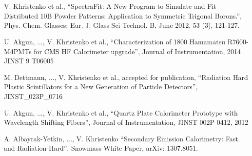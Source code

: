 \documentclass[10pt, letterpaper]{deps1}
\begin{document}
\vspace{5pt}
 \vspace{-10pt} \\

\\
\vspace{5pt}

\small{\begin{tightitemize}
    \item V. Khristenko et al., ``SpectraFit: A New Program to Simulate and Fit Distributed 10B Powder Patterns: Application to Symmetric Trigonal Borons.'', Phys. Chem. Glasses: Eur. J. Glass Sci Technol. B, June 2012, 53 (3), 121-127.
    \item U. Akgun, ..., V. Khristenko et al., ``Characterization of 1800 Hamamatsu R7600-M4PMTs for CMS HF Calorimeter upgrade'', Journal of Instrumentation, 2014 JINST 9 T06005
    \item M. Dettmann, ..., V. Khristenko et al., accepted for publication, ``Radiation Hard Plastic Scintillators for a New Generation of Particle Detectors'', JINST\_023P\_0716
    \item U. Akgun, ..., V. Khristenko et al., ``Quartz Plate Calorimeter Prototype with Wavelength Shifting Fibers'', Journal of Instrumentation, JINST 002P 0412, 2012
    \item A. Albayrak-Yetkin, ..., V. Khristenko ``Secondary Emission Calorimetry: Fast and Radiation-Hard'', Snowmass White Paper, arXiv: 1307.8051.
\end{tightitemize}}
\end{document}
